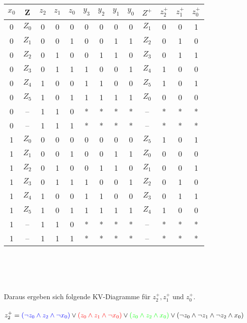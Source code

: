 \documentclass[11pt,a4paper]{article}
\begin{document}
\begin{tabular}{c | c | c | c | c | | c | c | c | c | | c | c | c | c}
$x_0$&Z&$z_2$&$z_1$&$z_0$&$y_3$&$y_2$&$y_1$&$y_0$&$Z^+$&$z^+_2$&$z^+_1$&$z^+_0$ \\ \hline
0&$Z_0$&0&0&0&0&0&0&0&$Z_1$&0&0&1\\
0&$Z_1$&0&0&1&0&0&1&1&$Z_2$&0&1&0\\
0&$Z_2$&0&1&0&0&1&1&0&$Z_3$&0&1&1\\
0&$Z_3$&0&1&1&1&0&0&1&$Z_4$&1&0&0\\
0&$Z_4$&1&0&0&1&1&0&0&$Z_5$&1&0&1\\
0&$Z_5$&1&0&1&1&1&1&1&$Z_0$&0&0&0\\
0&--&1&1&0&*&*&*&*&--&*&*&*\\
0&--&1&1&1&*&*&*&*&--&*&*&*\\ \hline
1&$Z_0$&0&0&0&0&0&0&0&$Z_5$&1&0&1\\
1&$Z_1$&0&0&1&0&0&1&1&$Z_0$&0&0&0\\
1&$Z_2$&0&1&0&0&1&1&0&$Z_1$&0&0&1\\
1&$Z_3$&0&1&1&1&0&0&1&$Z_2$&0&1&0\\
1&$Z_4$&1&0&0&1&1&0&0&$Z_3$&0&1&1\\
1&$Z_5$&1&0&1&1&1&1&1&$Z_4$&1&0&0\\
1&--&1&1&0&*&*&*&*&--&*&*&*\\
1&--&1&1&1&*&*&*&*&--&*&*&*\\
\end{tabular}\\
\\ \\  \\
Daraus ergeben sich folgende KV-Diagramme für $z^+_2,z^+_1$ und $z^+_0$.\\
\\
$z^+_2=\textcolor{blue}{ (\neg z_0 \wedge z_2 \wedge \neg x_0 ) } \vee \textcolor{red}{(z_0 \wedge z_1 \wedge \neg x_0)} \vee \textcolor{green}{(z_0 \wedge z_2 \wedge x_0)} \vee \textcolor{black}{ ( \neg z_0 \wedge \neg z_1 \wedge \neg z_2 \wedge x_0)}$\\
\\
\end{document}
